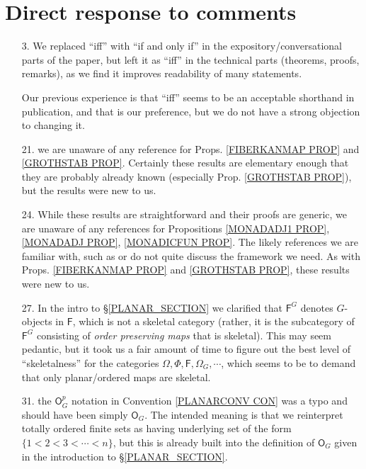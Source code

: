 \documentclass{article}
\begin{document}
\section{Direct response to comments}

\begin{itemize}
	\item[3.] We replaced ``iff'' with ``if and only if''
	in the expository/conversational parts of the paper, 
	but left it as ``iff'' in the technical parts (theorems, proofs, remarks), as we find it improves readability of many statements.
	
	Our previous experience is that ``iff'' seems to be an acceptable shorthand in publication, and that is our preference,
	but we do not have a strong objection to changing it.
	
	\item[21.] we are unaware of any reference for Props. 
	\ref{FIBERKANMAP PROP} and \ref{GROTHSTAB PROP}.
	Certainly these results are elementary enough that they are probably already known (especially Prop. \ref{GROTHSTAB PROP}),
	but the results were new to us. 
	
	\item[24.] While these results are straightforward 
	and their proofs are generic, 
	we are unaware of any references for Propositions \ref{MONADADJ1 PROP}, \ref{MONADADJ PROP}, \ref{MONADICFUN PROP}. The likely references we are familiar with, such as 
	\cite{Bo94} or \cite{Ri17} do not quite discuss the framework we need.
	As with Props. 
	\ref{FIBERKANMAP PROP} and \ref{GROTHSTAB PROP},
	these results were new to us.
	
	\item[27.] In the intro to \S \ref{PLANAR_SECTION} we
	clarified that $\mathsf{F}^G$ denotes $G$-objects in $\mathsf{F}$,
	which is not a skeletal category (rather, it is the subcategory of $\mathsf{F}^G$ consisting of \emph{order preserving maps} that is skeletal).
	This may seem pedantic,
	but it took us a fair amount of time to figure out the best level of ``skeletalness'' for the categories 
	$\Omega, \Phi, \mathsf{F}, \Omega_G, \cdots$, 
	which seems to be to demand that only planar/ordered maps are skeletal.
	
	\item[31.] the $\mathsf{O}^p_G$ notation in 
	Convention \ref{PLANARCONV CON}
	was a typo and should have been simply $\mathsf{O}_G$.
	The intended meaning is that we reinterpret totally ordered finite sets as having underlying set of the form
	$\{1<2<3<\cdots <n\}$,
	but this is already built into the definition of 
	$\mathsf{O}_G$ given in the introduction to
	\S \ref{PLANAR_SECTION}.
	

\end{itemize}
\end{document}

